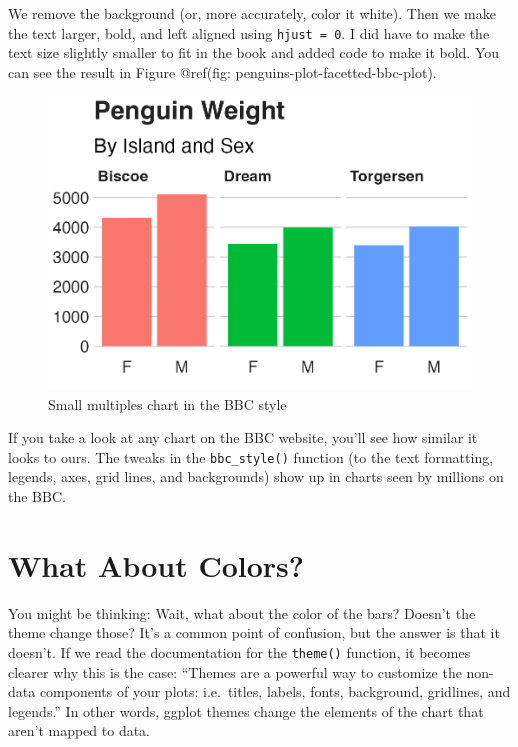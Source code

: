 \documentclass[
]{book}
\begin{document}
We remove the background (or, more accurately, color it white). Then we make the text larger, bold, and left aligned using \texttt{hjust\ =\ 0}. I did have to make the text size slightly smaller to fit in the book and added code to make it bold. You can see the result in Figure @ref(fig: penguins-plot-facetted-bbc-plot).

\begin{figure}
\includegraphics[width=1\linewidth]{custom-theme_files/figure-latex/penguins-plot-facetted-bbc-plot-1} \caption{Small multiples chart in the BBC style}\label{fig:penguins-plot-facetted-bbc-plot}
\end{figure}

If you take a look at any chart on the BBC website, you'll see how similar it looks to ours. The tweaks in the \texttt{bbc\_style()} function (to the text formatting, legends, axes, grid lines, and backgrounds) show up in charts seen by millions on the BBC.

\hypertarget{what-about-colors}{%
\section*{What About Colors?}\label{what-about-colors}}

You might be thinking: Wait, what about the color of the bars? Doesn't the theme change those? It's a common point of confusion, but the answer is that it doesn't. If we read the documentation for the \texttt{theme()} function, it becomes clearer why this is the case: ``Themes are a powerful way to customize the non-data components of your plots: i.e.~titles, labels, fonts, background, gridlines, and legends.'' In other words, ggplot themes change the elements of the chart that aren't mapped to data.
\end{document}
